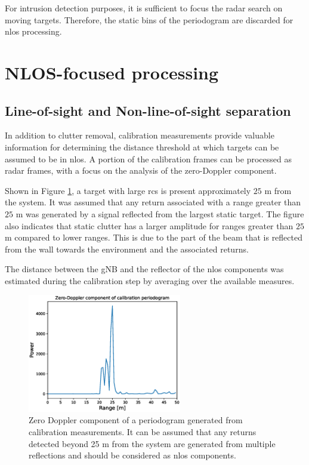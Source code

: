 	For intrusion detection purposes, it is sufficient to focus the radar search on moving targets. 
	Therefore, the static bins of the periodogram are discarded for \gls{nlos} processing.
	
	
	\section{NLOS-focused processing}
	\label{sec:nlos_proc_pipeline}
	
		\subsection{Line-of-sight and Non-line-of-sight separation}
		\label{sec:los_nlos_separation}
		
		
		
			In addition to clutter removal, calibration measurements provide valuable information for determining the distance threshold at which targets can be assumed to be in \gls{nlos}. 
			A portion of the calibration frames can be processed as radar frames, with a focus on the analysis of the zero-Doppler component.
			
			Shown in Figure \ref{fig:Test1_cali_static_per}, a target with large \gls{rcs} is present approximately $25$ m from the system. It was assumed that any return associated with a range greater than $25$ m was generated by a signal reflected from the largest static target. The figure also indicates that static clutter has a larger amplitude for ranges greater than $25$ m compared to lower ranges. This is due to the part of the beam that is reflected from the wall towards the environment and the associated returns.
			
			The distance between the gNB and the reflector of the \gls{nlos} components was estimated during the calibration step by averaging over the available measures.
			
			
			\begin{figure}[H]
				\centering
				\includegraphics[width=0.6\textwidth]{Images/Test1/cali_static_per_t1.eps}
				\caption{\small Zero Doppler component of a periodogram generated from calibration measurements. It can be assumed that any returns detected beyond 25 m from the system are generated from multiple reflections and should be considered as \gls{nlos} components. }
				\label{fig:Test1_cali_static_per}
			\end{figure}
		
